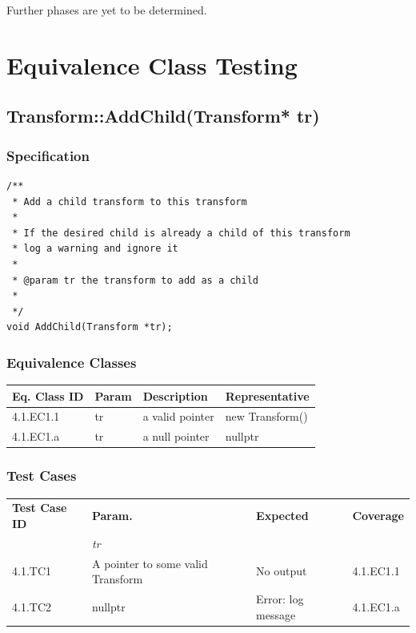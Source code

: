 \documentclass[11pt]{article}
\begin{document}
Further phases are yet to be determined.

\clearpage
\section{Equivalence Class Testing}
\label{sec:org411ecde}

\subsection{Transform::AddChild(Transform* tr)}
\label{sec:org9a9b086}
\subsubsection*{Specification}
\label{sec:org6ac7298}
\begin{verbatim}
/**
 * Add a child transform to this transform
 *
 * If the desired child is already a child of this transform
 * log a warning and ignore it
 *
 * @param tr the transform to add as a child
 *
 */
void AddChild(Transform *tr);

\end{verbatim}
\subsubsection*{Equivalence Classes}
\label{sec:org03343eb}
\begin{center}
\begin{tabularx}{\textwidth}{lXXX}
\hline
\textbf{Eq. Class ID} & \textbf{Param} & \textbf{Description} & \textbf{Representative}\\
\hline
4.1.EC1.1 & tr & a valid pointer & new Transform()\\
\hline
4.1.EC1.a & tr & a null pointer & nullptr\\
\hline
\end{tabularx}
\end{center}
\subsubsection*{Test Cases}
\label{sec:orgbf00bf7}
\begin{center}
\begin{tabularx}{\textwidth}{lXXX}
\hline
\textbf{Test Case ID} & \textbf{Param.} & \textbf{Expected} & \textbf{Coverage}\\
 & \textit{tr} &  & \\
\hline
4.1.TC1 & A pointer to some valid Transform & No output & 4.1.EC1.1\\
\hline
4.1.TC2 & nullptr & Error: log message & 4.1.EC1.a\\
\hline
\end{tabularx}
\end{center}
\end{document}
